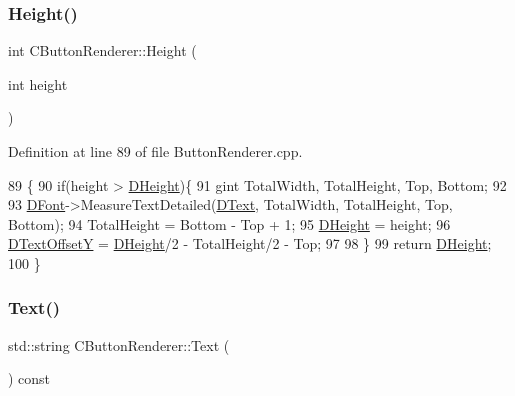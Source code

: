 \subsubsection{\texorpdfstring{Height()}{Height()}\hspace{0.1cm}{\footnotesize\ttfamily [2/2]}}
{\footnotesize\ttfamily int C\+Button\+Renderer\+::\+Height (\begin{DoxyParamCaption}\item[{int}]{height }\end{DoxyParamCaption})}



Definition at line 89 of file Button\+Renderer.\+cpp.


\begin{DoxyCode}
89                                      \{
90     \textcolor{keywordflow}{if}(height > \hyperlink{classCButtonRenderer_a7e3d605b90c45d87ac1396c23c90b250}{DHeight})\{
91         gint TotalWidth, TotalHeight, Top, Bottom;
92         
93         \hyperlink{classCButtonRenderer_adcdace35cb4fac1c90368b7cc86d860a}{DFont}->MeasureTextDetailed(\hyperlink{classCButtonRenderer_a8f058166dec8d1c73adc009e4c436092}{DText}, TotalWidth, TotalHeight, Top, Bottom);
94         TotalHeight = Bottom - Top + 1;
95         \hyperlink{classCButtonRenderer_a7e3d605b90c45d87ac1396c23c90b250}{DHeight} = height;
96         \hyperlink{classCButtonRenderer_a3922fa80775b693fd83e4d5e9f518b23}{DTextOffsetY} = \hyperlink{classCButtonRenderer_a7e3d605b90c45d87ac1396c23c90b250}{DHeight}/2 - TotalHeight/2 - Top;
97         
98     \}
99     \textcolor{keywordflow}{return} \hyperlink{classCButtonRenderer_a7e3d605b90c45d87ac1396c23c90b250}{DHeight};    
100 \}
\end{DoxyCode}
\hypertarget{classCButtonRenderer_ab0ff6bd90e3f7f7a9946c5c3198ed30c}{}\label{classCButtonRenderer_ab0ff6bd90e3f7f7a9946c5c3198ed30c} 
\subsubsection{\texorpdfstring{Text()}{Text()}\hspace{0.1cm}{\footnotesize\ttfamily [1/2]}}
{\footnotesize\ttfamily std\+::string C\+Button\+Renderer\+::\+Text (\begin{DoxyParamCaption}{ }\end{DoxyParamCaption}) const\hspace{0.3cm}{\ttfamily [inline]}}



